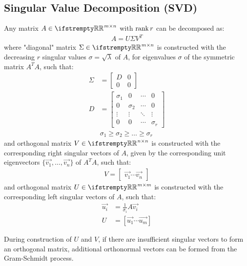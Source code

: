 \documentclass[12pt, a4paper]{article}
\begin{document}
\begin{multicols*}{3}
\colbreak

\subsection{Singular Value Decomposition (SVD)}
Any matrix $A \in \RR^{m{\times}n}$ with $\operatorname{rank} r$ can be decomposed as:
\begin{align*}
A = U{\Sigma}V^T
\end{align*}
where "diagonal" matrix $\Sigma \in \RR^{m{\times}n}$ is constructed with the decreasing $r$ singular values $\sigma = \sqrt{\lambda}$ of $A$, for eigenvalues $\sigma$ of the symmetric matrix $A^TA$, such that:
\begin{align*}
  \Sigma &= \begin{bmatrix}D & 0 \\ 0 & 0\end{bmatrix} \\
  D &= \begin{bmatrix}\sigma_1 & 0 & \cdots & 0 \\ 0 & \sigma_2 & \cdots & 0 \\ \vdots & \vdots & \ddots & \vdots \\ 0 & 0 & \cdots & \sigma_r\end{bmatrix} \\
    & \sigma_1 \geq \sigma_2 \geq \ldots \geq \sigma_r 
\end{align*}
and orthogonal matrix $V \in \RR^{n{\times}n}$ is constructed with the corresponding right singular vectors of $A$, given by the corresponding unit eigenvectors $\{\vec{v_1},\ldots,\vec{v_n}\}$ of $A^TA$, such that:
\begin{align*}
  V = \begin{bmatrix}\vec{v_1} \cdots \vec{v_n}\end{bmatrix}
\end{align*}
and orthogonal matrix $U \in \RR^{m{\times}m}$ is constructed with the corresponding left singular vectors of $A$, such that:
\begin{align*}
  \vec{u_i} &= \frac{1}{\sigma_i}A\vec{v_i} \\
  U &= [\vec{u_1} \cdots \vec{u_m}]
\end{align*}

During construction of $U$ and $V$, if there are insufficient singular vectors to form an orthogonal matrix, additional orthonormal vectors can be formed from the Gram-Schmidt process.



\end{multicols*}
\end{document}
